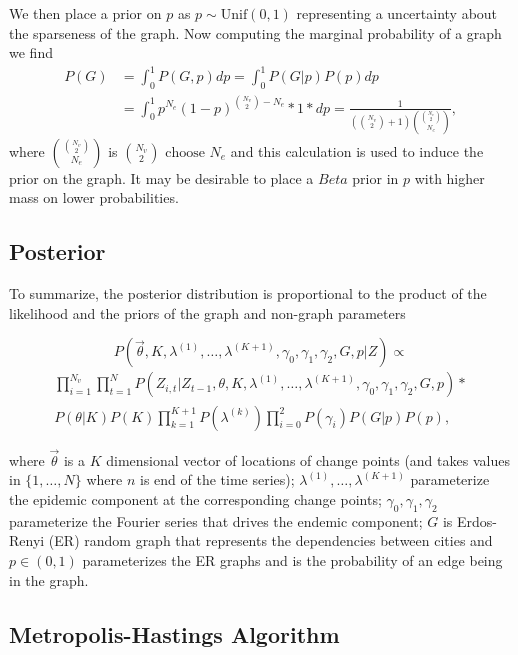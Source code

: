 \documentclass[11pt,a4paper]{article}
\begin{document}
We then place a prior on \(p\) as \(p \sim \text{Unif}(0,1)\)
representing a uncertainty about the sparseness of the graph. Now
computing the marginal probability of a graph we find
\[ \begin{aligned} P(G)  & = \int_0^1  P(G,p)dp   = \int_0^1 P(G|p)P(p)dp \\ 
&= \int_0^1 p^{N_e}(1-p)^{\binom{N_v}{2}-N_e}*1*dp = \frac{1}{(\binom{N_v}{2}+1) \binom{\binom{N_v}{2}}{N_e} },  \end{aligned}\]
where \(\binom{\binom{N_v}{2}}{N_e }\) is
\(\binom{N_v}{2} \text{ choose } N_e\) and this calculation is used to
induce the prior on the graph. It may be desirable to place a \(Beta\)
prior in \(p\) with higher mass on lower probabilities.

\hypertarget{posterior}{%
\subsection{Posterior}\label{posterior}}

To summarize, the posterior distribution is proportional to the product
of the likelihood and the priors of the graph and non-graph parameters

\[ P(\vec{\theta}, K, \lambda^{(1)}, \dots, \lambda^{(K+1)}, \gamma_0, \gamma_1, \gamma_2, G,p|Z)  \propto \]
\[\begin{aligned}\prod_{i=1}^{N_v}\prod_{t=1}^N P(Z_{i,t}|Z_{t-1},\theta, K, \lambda^{(1)}, \dots, \lambda^{(K+1)}, \gamma_0, \gamma_1, \gamma_2,G,p)*\\P(\theta|K)P(K)\prod_{k=1}^{K+1}P(\lambda^{(k)} )\prod_{i=0}^2P( \gamma_i)P(G|p)P(p), \end{aligned} \]

where \(\vec{\theta}\) is a \(K\) dimensional vector of locations of
change points (and takes values in \(\{1,\dots,N\}\) where \(n\) is end
of the time series); \(\lambda^{(1)}, \dots, \lambda^{(K+1)}\)
parameterize the epidemic component at the corresponding change points;
\(\gamma_0, \gamma_1, \gamma_2\) parameterize the Fourier series that
drives the endemic component; \(G\) is Erdos-Renyi (ER) random graph
that represents the dependencies between cities and \(p \in (0,1)\)
parameterizes the ER graphs and is the probability of an edge being in
the graph.

\hypertarget{metropolis-hastings-algorithm}{%
\subsection{Metropolis-Hastings
Algorithm}\label{metropolis-hastings-algorithm}}
\end{document}
